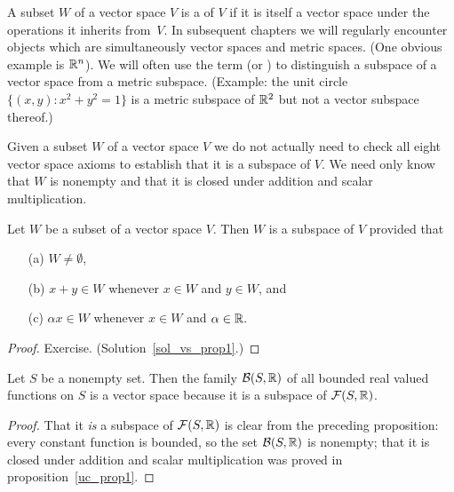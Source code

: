 \begin{defn} A subset $W$ of a vector space $V$ is a
 of $V$ if it is itself a vector space under the operations it inherits from~$V$.
In subsequent chapters we will regularly encounter objects which are simultaneously vector
spaces and metric spaces.  (One obvious example is $\mathbb{R}^n$).  We will often use the term
 (or
) to distinguish a subspace of a vector space from a metric subspace.
(Example: the unit circle $\{(x,y) \colon x^2 + y^2 = 1\}$ is a metric subspace of $\mathbb{R}^2$ but
not a vector subspace thereof.)
\end{defn}

Given a subset $W$ of a vector space $V$ we do not actually need to check all eight vector
space axioms to establish that it is a subspace of $V$.  We need only know that $W$ is
nonempty and that it is closed under addition and scalar multiplication.

\begin{prop}\label{vs_prop1} Let $W$ be a subset of a vector space $V$.  Then $W$ is a subspace
of $V$ provided that
 \begin{enumerate}
  \item[(a)] $W \ne \emptyset$,
  \item[(b)] $x + y \in W$ whenever $x \in W$ and $y \in W$, and
  \item[(c)] $\alpha x \in W$ whenever $x \in W$ and $\alpha \in \mathbb{R}.$
 \end{enumerate}
\end{prop}

\begin{proof} Exercise.  (Solution~\ref{sol_vs_prop1}.)  \ns   \end{proof}

\begin{exam} Let $S$ be a nonempty set.  Then the family $\mathcal{B}(S,\mathbb{R})$ of all bounded real
valued functions on $S$ is a vector space because it is a subspace of $\mathcal{F}(S,\mathbb{R})$.
\end{exam}

\begin{proof}   That it \emph{is} a subspace of $\mathcal{F}(S,\mathbb{R})$ is clear from the preceding
proposition: every constant function is bounded, so the set $\mathcal{B}(S,\mathbb{R})$ is nonempty; that
it is closed under addition and scalar multiplication was proved in
proposition~\ref{uc_prop1}.
\end{proof}

